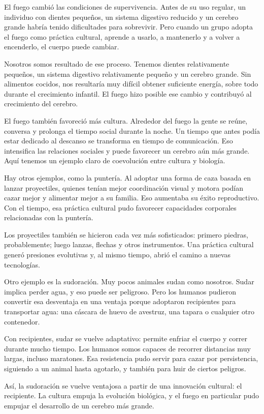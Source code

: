\documentclass[12pt, letterpaper]{article}
\begin{document}
El fuego cambió las condiciones de supervivencia. Antes de su uso regular, un individuo con dientes pequeños, un sistema digestivo reducido y un cerebro grande habría tenido dificultades para sobrevivir. Pero cuando un grupo adopta el fuego como práctica cultural, aprende a usarlo, a mantenerlo y a volver a encenderlo, el cuerpo puede cambiar.

Nosotros somos resultado de ese proceso. Tenemos dientes relativamente pequeños, un sistema digestivo relativamente pequeño y un cerebro grande. Sin alimentos cocidos, nos resultaría muy difícil obtener suficiente energía, sobre todo durante el crecimiento infantil. El fuego hizo posible ese cambio y contribuyó al crecimiento del cerebro.

El fuego también favoreció más cultura. Alrededor del fuego la gente se reúne, conversa y prolonga el tiempo social durante la noche. Un tiempo que antes podía estar dedicado al descanso se transforma en tiempo de comunicación. Eso intensifica las relaciones sociales y puede favorecer un cerebro aún más grande. Aquí tenemos un ejemplo claro de coevolución entre cultura y biología.

Hay otros ejemplos, como la puntería. Al adoptar una forma de caza basada en lanzar proyectiles, quienes tenían mejor coordinación visual y motora podían cazar mejor y alimentar mejor a su familia. Eso aumentaba su éxito reproductivo. Con el tiempo, esa práctica cultural pudo favorecer capacidades corporales relacionadas con la puntería.

Los proyectiles también se hicieron cada vez más sofisticados: primero piedras, probablemente; luego lanzas, flechas y otros instrumentos. Una práctica cultural generó presiones evolutivas y, al mismo tiempo, abrió el camino a nuevas tecnologías.

Otro ejemplo es la sudoración. Muy pocos animales sudan como nosotros. Sudar implica perder agua, y eso puede ser peligroso. Pero los humanos pudieron convertir esa desventaja en una ventaja porque adoptaron recipientes para transportar agua: una cáscara de huevo de avestruz, una tapara o cualquier otro contenedor.

Con recipientes, sudar se vuelve adaptativo: permite enfriar el cuerpo y correr durante mucho tiempo. Los humanos somos capaces de recorrer distancias muy largas, incluso maratones. Esa resistencia pudo servir para cazar por persistencia, siguiendo a un animal hasta agotarlo, y también para huir de ciertos peligros.

Así, la sudoración se vuelve ventajosa a partir de una innovación cultural: el recipiente. La cultura empuja la evolución biológica, y el fuego en particular pudo empujar el desarrollo de un cerebro más grande.
\end{document}
